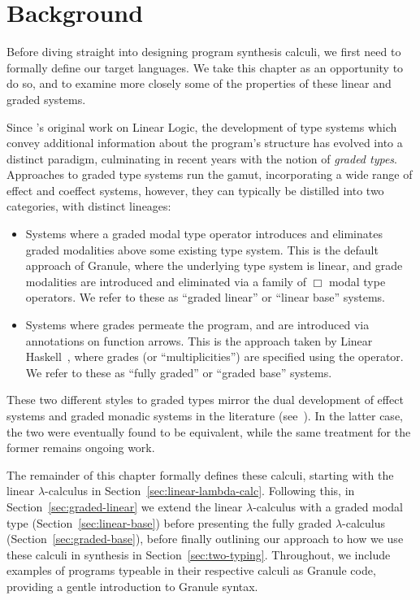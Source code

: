 \chapter{Background}
\label{chapter:background}
Before diving straight into designing program synthesis calculi, we first need
to formally define our target languages. We take
this chapter as an opportunity to do so, and to examine more closely some
of the properties of these linear and graded systems. 

Since \citet{girard1987linear}'s original work on Linear Logic,
the development of type systems which convey additional information about the
program's structure has evolved into a distinct paradigm, culminating in recent
years with the notion of \textit{graded types}. Approaches to graded type
systems run the gamut, incorporating a wide range of effect and coeffect
systems, however, they can typically be distilled into two categories, with
distinct lineages: 
\begin{itemize}
  \item Systems where a graded modal type operator introduces and eliminates
        graded modalities above some existing type system. This is the default
        approach of Granule, where the underlying type system is linear, and
        grade modalities are introduced and eliminated via a family of $\Box$
        modal type operators. We refer to these as ``graded linear'' or ``linear
        base'' systems.
  \item Systems where grades permeate the program, and are introduced via
        annotations on function arrows. This is the approach taken by Linear
        Haskell~\citep{DBLP:journals/pacmpl/BernardyBNJS18}, where grades (or
        ``multiplicities'') are specified using the \granin{\%} operator. We
        refer to these as ``fully graded'' or ``graded base'' systems.
\end{itemize}  
These two different styles to graded types mirror the dual development of effect
systems and graded monadic systems in the literature
(see~\citet{10.1145/601775.601776}). In the latter case, the two were eventually
found to be equivalent, while the same treatment for the former remains ongoing
work. 

The remainder of this chapter formally defines these calculi, starting with the
linear $\lambda$-calculus in Section~\ref{sec:linear-lambda-calc}. Following
this, in Section~\ref{sec:graded-linear} we extend the linear $\lambda$-calculus
with a graded modal type (Section~\ref{sec:linear-base}) before presenting the
fully graded $\lambda$-calculus (Section~\ref{sec:graded-base}), before finally
outlining our approach to how we use these calculi in synthesis in
Section~\ref{sec:two-typing}. Throughout, we include examples of programs
typeable in their respective calculi as Granule code, providing a gentle
introduction to Granule syntax. 

